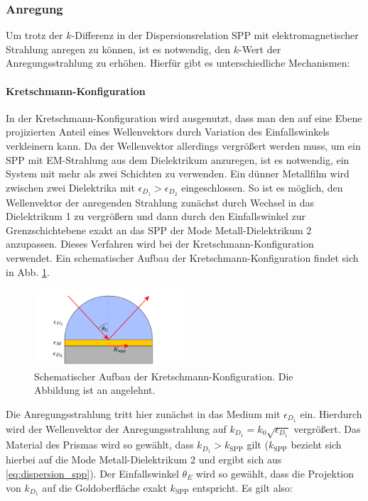 \documentclass[titlepage]{article}
\begin{document}
	\subsubsection{Anregung}
	Um trotz der $k$-Differenz in der Dispersionsrelation SPP mit elektromagnetischer Strahlung anregen zu können, ist es notwendig, den $k$-Wert der Anregungsstrahlung zu erhöhen. Hierfür gibt es unterschiedliche Mechanismen:
	\paragraph{Kretschmann-Konfiguration}
	In der Kretschmann-Konfiguration wird ausgenutzt, dass man den auf eine Ebene projizierten Anteil eines Wellenvektors durch Variation des Einfallswinkels verkleinern kann. Da der Wellenvektor allerdings vergrößert werden muss, um ein SPP mit EM-Strahlung aus dem Dielektrikum anzuregen, ist es notwendig, ein System mit mehr als zwei Schichten zu verwenden. Ein dünner Metallfilm wird zwischen zwei Dielektrika mit $\epsilon_{D_1} > \epsilon_{D_2}$ eingeschlossen. So ist es möglich, den Wellenvektor der anregenden Strahlung zunächst durch Wechsel in das Dielektrikum 1 zu vergrößern und dann durch den Einfallswinkel zur Grenzschichtebene exakt an das SPP der Mode Metall-Dielektrikum 2 anzupassen. Dieses Verfahren wird bei der Kretschmann-Konfiguration verwendet. Ein schematischer Aufbau der Kretschmann-Konfiguration findet sich in Abb. \ref{fig:kretschman}.
	\begin{figure}[h] 
		\centering
		\includegraphics[width=0.5\textwidth]{figures/Kretschmann.pdf}
		\caption[Kretschmann-Konfiguration]{Schematischer Aufbau der Kretschmann-Konfiguration. Die Abbildung ist an \cite{Jaruschewski.2020} angelehnt.}
		\label{fig:kretschman}
	\end{figure}
	Die Anregungsstrahlung tritt hier zunächst in das Medium mit $\epsilon_{D_1}$ ein. Hierdurch wird der Wellenvektor der Anregungsstrahlung auf $k_{D_1}=k_0\sqrt{\epsilon_{D_1}}$ vergrößert. Das Material des Prismas wird so gewählt, dass $k_{D_1}> k_{\mathrm{SPP}}$ gilt ($k_{\mathrm{SPP}}$ bezieht sich hierbei auf die Mode Metall-Dielektrikum 2 und ergibt sich aus \eqref{eq:dispersion_spp}). Der Einfallswinkel $\theta_E$ wird so gewählt, dass die Projektion von $k_{D_1}$ auf die Goldoberfläche exakt $k_{\mathrm{SPP}}$ entspricht. Es gilt also:
\end{document}
